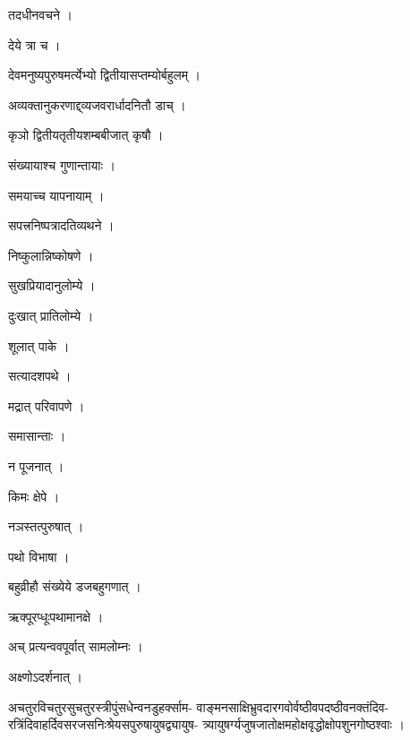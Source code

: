 \documentclass[10pt, openany]{book}
\begin{document}
\noindent तदधीनवचने ।

\noindent देये त्रा च ।

\noindent देवमनुष्यपुरुषमर्त्येभ्यो द्वितीयासप्तम्योर्बहुलम् ।

\noindent अव्यक्तानुकरणाद्द्व्यजवरार्धादनितौ डाच् ।

\noindent कृञो द्वितीयतृतीयशम्बबीजात् कृषौ ।

\noindent संख्यायाश्च गुणान्तायाः ।

\noindent समयाच्च यापनायाम् ।

\noindent सपत्त्रनिष्पत्रादतिव्यथने ।

\noindent निष्कुलान्निष्कोषणे ।

\noindent सुखप्रियादानुलोम्ये ।

\noindent दुःखात् प्रातिलोम्ये ।

\noindent शूलात् पाके ।

\noindent सत्यादशपथे ।

\noindent मद्रात् परिवापणे ।

\noindent समासान्ताः ।

\noindent न पूजनात् ।

\noindent किमः क्षेपे ।

\noindent नञस्तत्पुरुषात् ।

\noindent पथो विभाषा ।

\noindent बहुव्रीहौ संख्येये डजबहुगणात् ।

\noindent ऋक्पूरप्धूःपथामानक्षे ।

\noindent अच् प्रत्यन्ववपूर्वात् सामलोम्नः ।

\noindent अक्ष्णोऽदर्शनात् ।

\noindent अचतुरविचतुरसुचतुरस्त्रीपुंसधेन्वनडुहर्क्साम- वाङ्मनसाक्षिभ्रुवदारगवोर्वष्ठीवपदष्ठीवनक्तंदिव- रत्रिंदिवाहर्दिवसरजसनिःश्रेयसपुरुषायुषद्व्यायुष- त्र्यायुषर्ग्यजुषजातोक्षमहोक्षवृद्धोक्षोपशुनगोष्ठश्वाः ।
\end{document}
